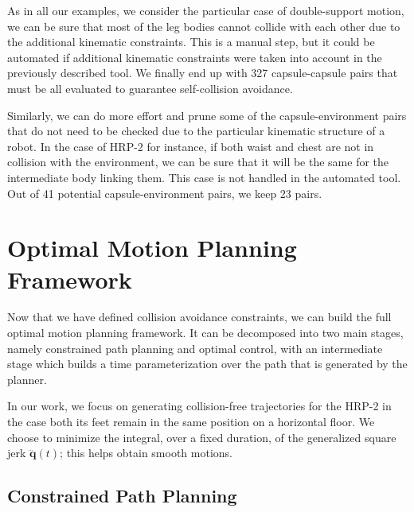 As in all our examples, we consider the particular case of
double-support motion, we can be sure that most of the leg bodies
cannot collide with each other due to the additional kinematic
constraints. This is a manual step, but it could be automated if
additional kinematic constraints were taken into account in the
previously described tool. We finally end up with 327 capsule-capsule
pairs that must be all evaluated to guarantee self-collision
avoidance.

Similarly, we can do more effort and prune some of the
capsule-environment pairs that do not need to be checked due to the
particular kinematic structure of a robot. In the case of HRP-2 for
instance, if both waist and chest are not in collision with the
environment, we can be sure that it will be the same for the
intermediate body linking them. This case is not handled in the
automated tool. Out of 41 potential capsule-environment pairs, we keep
23 pairs.

\section{Optimal Motion Planning Framework}
\label{sec:chap3-omp-framework}

Now that we have defined collision avoidance constraints, we can build
the full optimal motion planning framework. It can be decomposed into
two main stages, namely constrained path planning and optimal control,
with an intermediate stage which builds a time parameterization over
the path that is generated by the planner.

In our work, we focus on generating collision-free trajectories for
the HRP-2 in the case both its feet remain in the same position on a
horizontal floor. We choose to minimize the integral, over a fixed
duration, of the generalized square jerk $\dddot{\mathbf{q}}(t)$; this
helps obtain smooth motions.

\subsection{Constrained Path Planning}
\label{subsec:chap3-path-planning}

